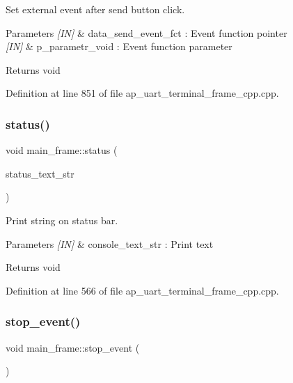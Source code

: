 Set external event after send button click. 


\begin{DoxyParams}{Parameters}
{\em \mbox{[}\+I\+N\mbox{]}} & data\+\_\+send\+\_\+event\+\_\+fct \+: Event function pointer \\
\hline
{\em \mbox{[}\+I\+N\mbox{]}} & p\+\_\+parametr\+\_\+void \+: Event function parameter \\
\hline
\end{DoxyParams}
\begin{DoxyReturn}{Returns}
void 
\end{DoxyReturn}


Definition at line 851 of file ap\+\_\+uart\+\_\+terminal\+\_\+frame\+\_\+cpp.\+cpp.

\mbox{\label{group___u_a_r_t__terminal_ga3489df4399e4cae50fa64dfbe6120a9c}} 
\subsubsection{status()}
{\footnotesize\ttfamily void main\+\_\+frame\+::status (\begin{DoxyParamCaption}\item[{wx\+String}]{status\+\_\+text\+\_\+str }\end{DoxyParamCaption})}



Print string on status bar. 


\begin{DoxyParams}{Parameters}
{\em \mbox{[}\+I\+N\mbox{]}} & console\+\_\+text\+\_\+str \+: Print text \\
\hline
\end{DoxyParams}
\begin{DoxyReturn}{Returns}
void 
\end{DoxyReturn}


Definition at line 566 of file ap\+\_\+uart\+\_\+terminal\+\_\+frame\+\_\+cpp.\+cpp.

\mbox{\label{group___u_a_r_t__terminal_gaa03ec7d2d70bf973180401266d573737}} 
\subsubsection{stop\_event()}
{\footnotesize\ttfamily void main\+\_\+frame\+::stop\+\_\+event (\begin{DoxyParamCaption}\item[{void}]{ }\end{DoxyParamCaption})\hspace{0.3cm}{\ttfamily [static]}}



